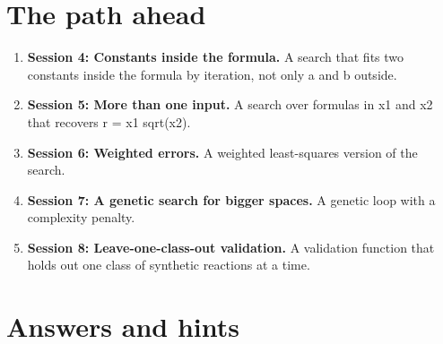 \documentclass[11pt,a4paper]{article}
\begin{document}
\section{The path ahead}
\begin{enumerate}[nosep]
\item \textbf{Session 4: Constants inside the formula.} A search that fits two constants inside the formula by iteration, not only a and b outside.
\item \textbf{Session 5: More than one input.} A search over formulas in x1 and x2 that recovers r = x1 sqrt(x2).
\item \textbf{Session 6: Weighted errors.} A weighted least-squares version of the search.
\item \textbf{Session 7: A genetic search for bigger spaces.} A genetic loop with a complexity penalty.
\item \textbf{Session 8: Leave-one-class-out validation.} A validation function that holds out one class of synthetic reactions at a time.
\end{enumerate}

\section{Answers and hints}
\end{document}
